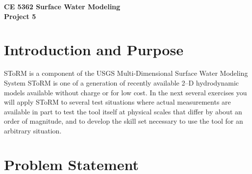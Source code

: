 \documentclass[12pt]{article}
\begin{document}
\begin{center}
{\textbf{{ CE 5362 Surface Water Modeling} \\ {Project 5}}}
\end{center}

\section*{{Introduction and Purpose}}
SToRM is a component of the USGS Multi-Dimensional Surface Water Modeling System \citep{mdswms2012}
SToRM is one of a generation of recently available 2--D hydrodynamic models available without charge or for low cost. 
In the next several exercises you will apply SToRM to several test situations where actual measurements are available in part to test the tool itself at physical scales that differ by about an order of magnitude, and to develop the skill set necessary to use the tool for an arbitrary situation.

\section*{{Problem Statement}}
\end{document}
